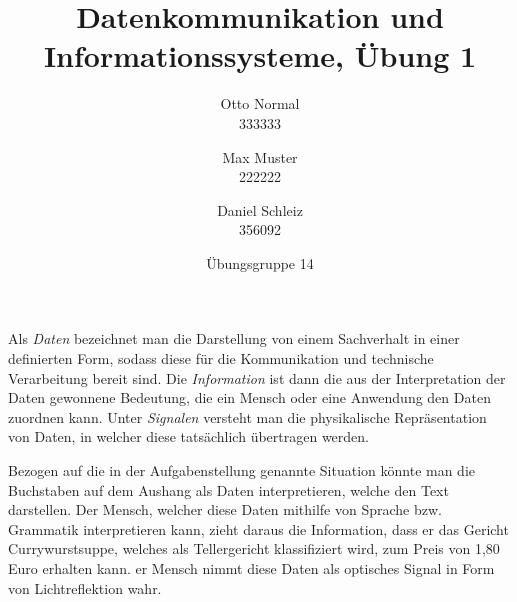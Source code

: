 \documentclass{../exercisesheet}
\title{Datenkommunikation und Informationssysteme, Übung 1}
\author{
    Otto Normal \\ 333333
    \and
    Max Muster \\ 222222
    \and 
    Daniel Schleiz \\ 356092
}
\date{Übungsgruppe 14}
\begin{document}
\maketitle
\pointtable

\begin{exercise}{3}
	Als \textit{Daten} bezeichnet man die Darstellung von einem Sachverhalt in einer definierten Form, sodass diese für die Kommunikation und technische Verarbeitung bereit sind.
	Die \textit{Information} ist dann die aus der Interpretation der Daten gewonnene Bedeutung, die ein Mensch oder eine Anwendung den Daten zuordnen kann. Unter \textit{Signalen}
	versteht man die physikalische Repräsentation von Daten, in welcher diese tatsächlich übertragen werden. \par
	Bezogen auf die in der Aufgabenstellung genannte Situation könnte man die Buchstaben auf dem Aushang als Daten interpretieren, welche den Text darstellen. Der Mensch,
	welcher diese Daten mithilfe von Sprache bzw. Grammatik interpretieren kann, zieht daraus die Information, dass er das Gericht Currywurstsuppe, welches als Tellergericht
	klassifiziert wird, zum Preis von 1,80 Euro erhalten kann. er Mensch nimmt diese Daten als optisches Signal in Form von Lichtreflektion wahr.\\
\end{exercise}

\begin{exercise}{5}
	\begin{subexercise}
		
	\end{subexercise}

	\begin{subexercise}
		  
	\end{subexercise}
\end{exercise}
\end{document}
